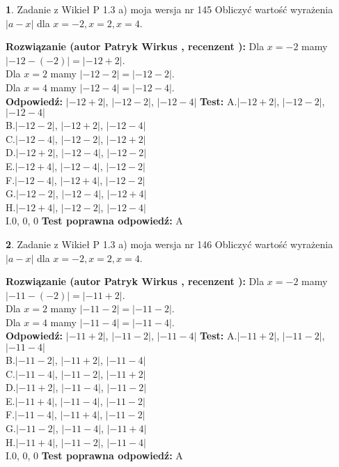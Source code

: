 \documentclass[12pt, a4paper]{article}
\theoremstyle{definition} %
\newtheorem{zad}{}
\newcommand{\zadStart}[1]{\begin{zad}#1\newline}
\newcommand{\zadStop}{\end{zad}}
\newcommand{\rozwStart}[2]{\noindent \textbf{Rozwiązanie (autor #1 , recenzent #2): }\newline}
\newcommand{\rozwStop}{\newline}
\newcommand{\odpStart}{\noindent \textbf{Odpowiedź:}\newline}
\newcommand{\odpStop}{\newline}
\newcommand{\testStart}{\noindent \textbf{Test:}\newline}
\newcommand{\testStop}{\newline}
\newcommand{\kluczStart}{\noindent \textbf{Test poprawna odpowiedź:}\newline}
\newcommand{\kluczStop}{\newline}
\begin{document}
\zadStart{Zadanie z Wikieł P 1.3 a) moja wersja nr 145}
Obliczyć wartość wyrażenia $|a - x|$ dla $x=-2,x=2,x=4$.
\zadStop
\rozwStart{Patryk Wirkus}{}
Dla $x = -2$ mamy $|-12 - (-2)| = |-12 + 2|$.\\
Dla $x = 2$ mamy $|-12 - 2| = |-12 - 2|$.\\
Dla $x = 4$ mamy $|-12 - 4| = |-12 - 4|$.\\
\rozwStop
\odpStart
$|-12 + 2|$, $|-12 - 2|$, $|-12 - 4|$
\odpStop
\testStart
A.$|-12 + 2|$, $|-12 - 2|$, $|-12 - 4|$\\
B.$|-12 - 2|$, $|-12 + 2|$, $|-12 - 4|$\\
C.$|-12 - 4|$, $|-12 - 2|$, $|-12 + 2|$\\
D.$|-12 + 2|$, $|-12 - 4|$, $|-12 - 2|$\\
E.$|-12 + 4|$, $|-12 - 4|$, $|-12 - 2|$\\
F.$|-12 - 4|$, $|-12 + 4|$, $|-12 - 2|$\\
G.$|-12 - 2|$, $|-12 - 4|$, $|-12 + 4|$\\
H.$|-12 + 4|$, $|-12 - 2|$, $|-12 - 4|$\\
I.$0$, $0$, $0$
\testStop
\kluczStart
A
\kluczStop



\zadStart{Zadanie z Wikieł P 1.3 a) moja wersja nr 146}
Obliczyć wartość wyrażenia $|a - x|$ dla $x=-2,x=2,x=4$.
\zadStop
\rozwStart{Patryk Wirkus}{}
Dla $x = -2$ mamy $|-11 - (-2)| = |-11 + 2|$.\\
Dla $x = 2$ mamy $|-11 - 2| = |-11 - 2|$.\\
Dla $x = 4$ mamy $|-11 - 4| = |-11 - 4|$.\\
\rozwStop
\odpStart
$|-11 + 2|$, $|-11 - 2|$, $|-11 - 4|$
\odpStop
\testStart
A.$|-11 + 2|$, $|-11 - 2|$, $|-11 - 4|$\\
B.$|-11 - 2|$, $|-11 + 2|$, $|-11 - 4|$\\
C.$|-11 - 4|$, $|-11 - 2|$, $|-11 + 2|$\\
D.$|-11 + 2|$, $|-11 - 4|$, $|-11 - 2|$\\
E.$|-11 + 4|$, $|-11 - 4|$, $|-11 - 2|$\\
F.$|-11 - 4|$, $|-11 + 4|$, $|-11 - 2|$\\
G.$|-11 - 2|$, $|-11 - 4|$, $|-11 + 4|$\\
H.$|-11 + 4|$, $|-11 - 2|$, $|-11 - 4|$\\
I.$0$, $0$, $0$
\testStop
\kluczStart
A
\kluczStop
\end{document}
